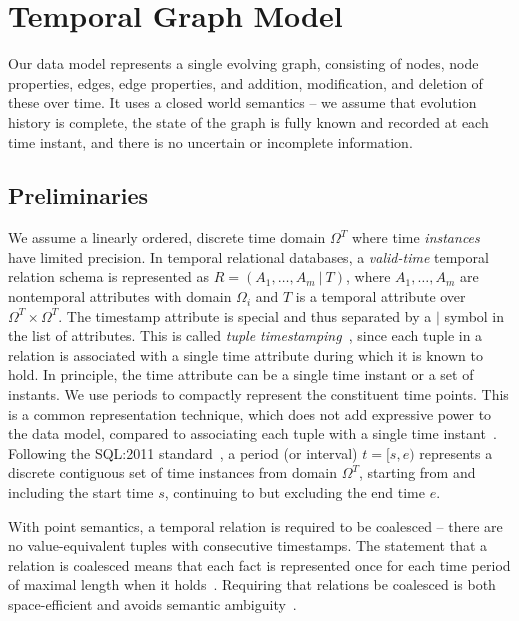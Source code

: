 \section{Temporal Graph Model}
\label{sec:model}

Our data model represents a single evolving graph, consisting of
nodes, node properties, edges, edge properties, and addition,
modification, and deletion of these over time.  It uses a closed world
semantics -- we assume that evolution history is complete, the state
of the graph is fully known and recorded at each time instant, and
there is no uncertain or incomplete information.

\subsection{Preliminaries}

We assume a linearly ordered, discrete time domain $\Omega^T$ where
time {\em instances} have limited precision.  In temporal relational
databases, a {\em valid-time} temporal relation schema is represented
as $R = (A_1, \ldots, A_m~|~T)$, where $A_1, \ldots, A_m$ are
nontemporal attributes with domain $\Omega_i$ and $T$ is a temporal
attribute over $\Omega^T \times \Omega^T$.  The timestamp attribute is
special and thus separated by a $|$ symbol in the list of attributes.
This is called {\em tuple
  timestamping}~\cite{Montanari2009}, since each tuple in a relation
is associated with a single time attribute during which it is known to
hold.  In principle, the time attribute can be a single time instant
or a set of instants.  We use periods to compactly represent the
constituent time points.  This is a common representation technique,
which does not add expressive power to the data model, compared to
associating each tuple with a single time
instant~\cite{DBLP:conf/ictl/Chomicki94}.  Following the SQL:2011
standard~\cite{DBLP:journals/sigmod/KulkarniM12}, a period (or
interval) $t = [s, e)$ represents a discrete contiguous set of time
  instances from domain $\Omega^T$, starting from and including the
  start time $s$, continuing to but excluding the end time $e$.

With point semantics, a temporal relation is required to be coalesced
-- there are no value-equivalent tuples with consecutive timestamps.
The statement that a relation is coalesced means that each fact is
represented once for each time period of maximal length when it
holds~\cite{DBLP:conf/vldb/BohlenSS96}.  Requiring that relations be
coalesced is both space-efficient and avoids semantic
ambiguity~\cite{DBLP:reference/db/JensenS09k}.

